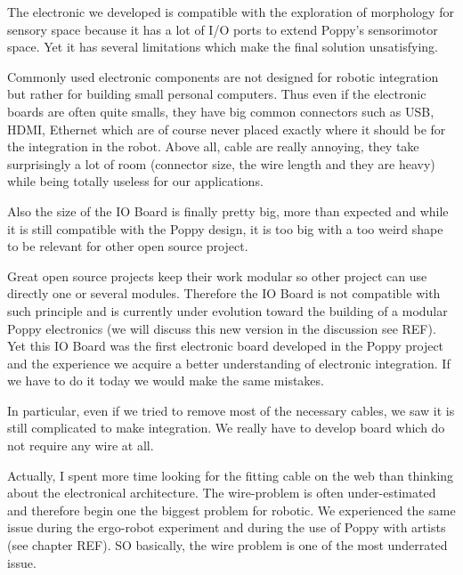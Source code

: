 The electronic we developed is compatible with the exploration of morphology for sensory space because it has a lot of I/O ports to extend Poppy's sensorimotor space. Yet it has several limitations which make the final solution unsatisfying.

Commonly used electronic components are not designed for robotic integration but rather for building small personal computers. Thus even if the electronic boards are often quite smalls, they have big common connectors such as USB, HDMI, Ethernet which are of course never placed exactly where it should be for the integration in the robot.
Above all, cable are really annoying, they take surprisingly a lot of room (connector size, the wire length and they are heavy) while being totally useless for our applications.

Also the size of the IO Board is finally pretty big, more than expected and while it is still compatible with the Poppy design, it is too big with a too weird shape to be relevant for other open source project.

Great open source projects keep their work modular so other project can use directly one or several modules. Therefore the IO Board is not compatible with such principle and is currently under evolution toward the building of a modular Poppy electronics (we will discuss this new version in the discussion see REF). Yet this IO Board was the first electronic board developed in the Poppy project and the experience we acquire a better understanding of electronic integration. If we have to do it today we would make the same mistakes.

In particular, even if we tried to remove most of the necessary cables, we saw it is still complicated to make integration. We really have to develop board which do not require any wire at all.

Actually, I spent more time looking for the fitting cable on the web than thinking about the electronical architecture. The wire-problem is often under-estimated and therefore begin one the biggest problem for robotic. We experienced the same issue during the ergo-robot experiment and during the use of Poppy with artists (see chapter REF). SO basically, the wire problem is one of the most underrated issue.


